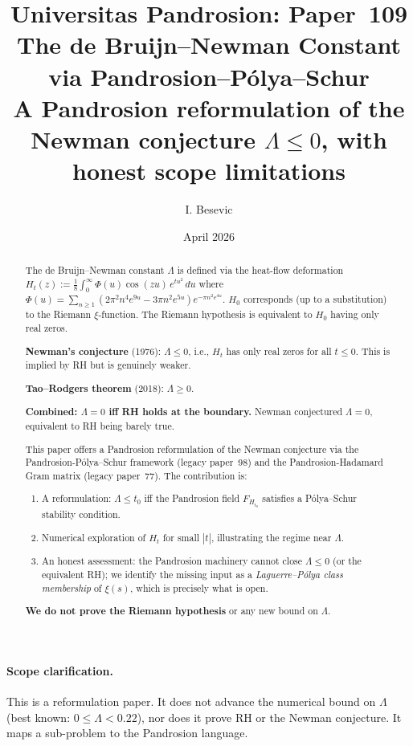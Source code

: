 \documentclass[11pt,a4paper]{article}
\title{Universitas Pandrosion: Paper~109 \\
The de Bruijn--Newman Constant via Pandrosion--P\'olya--Schur \\
\large A Pandrosion reformulation of the Newman conjecture
$\Lambda \le 0$, with honest scope limitations}
\author{I. Besevic}
\date{April 2026}
\begin{document}
\maketitle

\begin{abstract}
The de Bruijn--Newman constant $\Lambda$ is defined via the heat-flow deformation
$H_t(z) := \frac{1}{8} \int_0^\infty \Phi(u) \cos(zu)\, e^{tu^2}\, du$ where
$\Phi(u) = \sum_{n \ge 1} (2\pi^2 n^4 e^{9u} - 3\pi n^2 e^{5u}) e^{-\pi n^2 e^{4u}}$.
$H_0$ corresponds (up to a substitution) to the Riemann $\xi$-function. The
Riemann hypothesis is equivalent to $H_0$ having only real zeros.

\textbf{Newman's conjecture} (1976): $\Lambda \le 0$, i.e., $H_t$ has only real zeros
for all $t \le 0$. This is implied by RH but is genuinely weaker.

\textbf{Tao--Rodgers theorem} (2018): $\Lambda \ge 0$.

\textbf{Combined: $\Lambda = 0$ iff RH holds at the boundary.} Newman conjectured
$\Lambda = 0$, equivalent to RH being barely true.

This paper offers a Pandrosion reformulation of the Newman conjecture via the
Pandrosion-P\'olya--Schur framework (legacy paper~98) and the Pandrosion-Hadamard
Gram matrix (legacy paper~77). The contribution is:

\begin{enumerate}
\item A reformulation: $\Lambda \le t_0$ iff the Pandrosion field $F_{H_{t_0}}$
satisfies a P\'olya--Schur stability condition.
\item Numerical exploration of $H_t$ for small $|t|$, illustrating the regime
near $\Lambda$.
\item An honest assessment: the Pandrosion machinery cannot close
$\Lambda \le 0$ (or the equivalent RH); we identify the missing input as a
\emph{Laguerre--P\'olya class membership} of $\xi(s)$, which is precisely
what is open.
\end{enumerate}

\textbf{We do not prove the Riemann hypothesis} or any new bound on $\Lambda$.
\end{abstract}

\paragraph{Scope clarification.}
This is a reformulation paper. It does not advance the numerical bound on
$\Lambda$ (best known: $0 \le \Lambda < 0.22$), nor does it prove RH or the
Newman conjecture. It maps a sub-problem to the Pandrosion language.
\end{document}
